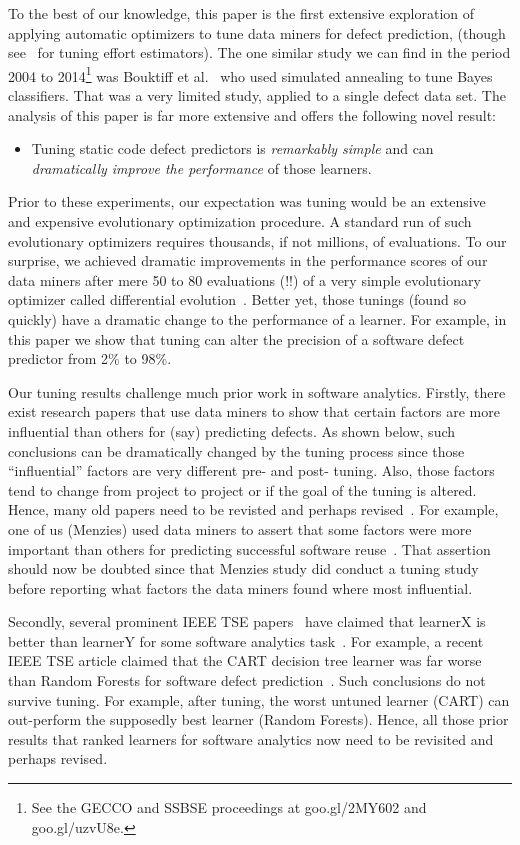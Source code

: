 \documentclass{sig-alternative}
\newcommand{\bi}{\begin{itemize}[leftmargin=0.4cm]}
\newcommand{\ei}{\end{itemize}}
\begin{document}
To the best of our knowledge, this paper is the first extensive exploration 
of applying automatic optimizers to tune data miners for defect prediction,
(though see~\cite{cora10,balogh12,Minku13,minku13z} for tuning effort estimators).
The one similar study  we can find in the period 2004 to 2014\footnote{See the GECCO and SSBSE proceedings at    goo.gl/2MY602 and goo.gl/uzvU8e.} was
Bouktiff et al.~\cite{Bouktif06} who used  simulated annealing to tune Bayes classifiers.
That was a very limited study, applied to a  single defect data set.
The analysis of this paper is far more extensive and offers the following novel result:
\bi
\item
Tuning static code defect predictors is {\em remarkably simple} and can {\em dramatically improve the performance}
of those learners. 
\ei
Prior to these experiments, our expectation was tuning
would be an  extensive and expensive evolutionary optimization procedure. 
A standard run of such evolutionary optimizers requires   thousands,
if not millions, of evaluations.
To
our surprise, we achieved dramatic improvements in the performance scores
of our data miners after  mere 50 to 80 evaluations (!!) of a very simple evolutionary 
optimizer  called differential evolution~\cite{storn1997differential}.
Better yet,  those  tunings (found so quickly)   
  have a dramatic change to the performance of a learner. For example,
in this paper we show that tuning can alter the precision of
a software defect predictor from 2\% to 98\%.

Our tuning results  challenge much prior work in software analytics. 
Firstly, there exist research papers
that use data miners to   show that certain factors
are more influential than others for (say)
predicting defects. As shown below, such conclusions can be dramatically
changed by the tuning process since those  ``influential'' factors are very different pre- and post- tuning. Also, those factors tend to  change from project to project or if the goal
of the tuning is altered.
Hence, many old papers    need to be revisted  and perhaps revised~\cite{bell2013limited,rahman2013how,me02k,moser2008comparative,zimmermann2007predicting,herzig2013predicting}.  
For example, one of us (Menzies) used data miners
to assert that some factors were more important than others for predicting
successful software reuse~\cite{me02k}. That assertion should now be doubted since that
Menzies study did conduct a tuning study before reporting what factors the data miners
found where most influential.

Secondly, several   prominent IEEE TSE papers~\cite{lessmann2008benchmarking,hall11,me07b} have claimed 
that learnerX is better than learnerY for some software analytics task~.
For example, a recent IEEE TSE article claimed that the 
CART decision tree learner was far worse than Random Forests for
software defect prediction~\cite{lessmann2008benchmarking}. 
Such conclusions do not survive tuning.
For example,
after tuning, the worst untuned learner (CART) can out-perform the supposedly
best learner (Random Forests). Hence, all those prior results that ranked learners for software
analytics now need to be revisited and perhaps revised.
\end{document}
